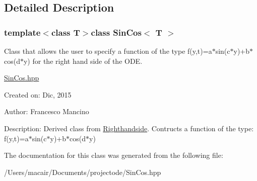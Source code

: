 \subsection{Detailed Description}
\subsubsection*{template$<$class T$>$class Sin\+Cos$<$ T $>$}

Class that allows the user to specify a function of the type f(y,t)=a$\ast$sin(c$\ast$y)+b$\ast$cos(d$\ast$y) for the right hand side of the O\+D\+E. 

\hyperlink{_sin_cos_8hpp_source}{Sin\+Cos.\+hpp}

Created on\+: Dic, 2015 \begin{DoxyVerb}Author: Francesco Mancino
\end{DoxyVerb}


Description\+: Derived class from \hyperlink{class_righthandside}{Righthandside}. Contructs a function of the type\+: f(y,t)=a$\ast$sin(c$\ast$y)+b$\ast$cos(d$\ast$y) 

The documentation for this class was generated from the following file\+:\begin{DoxyCompactItemize}
\item 
/\+Users/macair/\+Documents/projectode/Sin\+Cos.\+hpp\end{DoxyCompactItemize}
